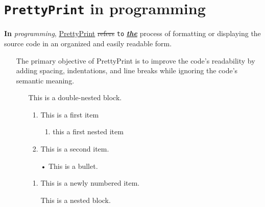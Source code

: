 \documentclass[12pt, a4paper]{article}
\begin{document}
\section{\texttt{PrettyPrint} in programming}
\textbf{In} \textit{programming}, \underline{PrettyPrint} \sout{refers} \texttt{to} \underline{\textbf{\textit{the}}} process of formatting or displaying the source code in an organized and easily readable form. 
\begin{itemize}
\item[ ] The primary objective of PrettyPrint is to improve the code's readability by adding spacing, indentations, and line breaks while ignoring the code's semantic meaning.
\begin{itemize}
\item[ ] This is a double-nested block.
\begin{enumerate}
\item This is a first item
\begin{enumerate}
\item this a first nested item
\end{enumerate}
\item This is a second item.
\end{enumerate}
\begin{itemize}
\item[•] This is a bullet.
\end{itemize}
\begin{enumerate}
\item This is a newly numbered item.
\item[ ] This is a nested block.
\end{enumerate}
\end{itemize}
\end{itemize}
\end{document}
